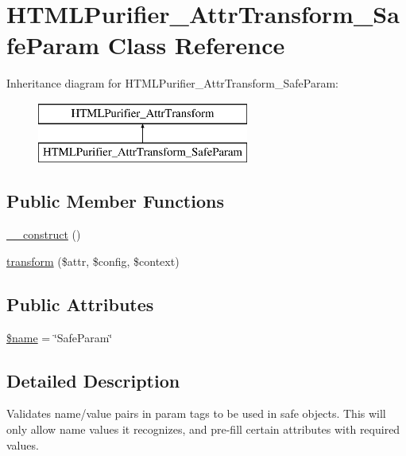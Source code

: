 \hypertarget{classHTMLPurifier__AttrTransform__SafeParam}{\section{H\+T\+M\+L\+Purifier\+\_\+\+Attr\+Transform\+\_\+\+Safe\+Param Class Reference}
\label{classHTMLPurifier__AttrTransform__SafeParam}
}
Inheritance diagram for H\+T\+M\+L\+Purifier\+\_\+\+Attr\+Transform\+\_\+\+Safe\+Param\+:\begin{figure}[H]
\begin{center}
\leavevmode
\includegraphics[height=2.000000cm]{classHTMLPurifier__AttrTransform__SafeParam}
\end{center}
\end{figure}
\subsection*{Public Member Functions}
\begin{DoxyCompactItemize}
\item 
\hyperlink{classHTMLPurifier__AttrTransform__SafeParam_adf81c967d3cee3fdafbcda841b3c742b}{\+\_\+\+\_\+construct} ()
\item 
\hyperlink{classHTMLPurifier__AttrTransform__SafeParam_a052a20ffffaf8c66d5de4c26278c5729}{transform} (\$attr, \$config, \$context)
\end{DoxyCompactItemize}
\subsection*{Public Attributes}
\begin{DoxyCompactItemize}
\item 
\hyperlink{classHTMLPurifier__AttrTransform__SafeParam_af4fd8183836a1d11286a76a0851f6b14}{\$name} = \char`\"{}Safe\+Param\char`\"{}
\end{DoxyCompactItemize}


\subsection{Detailed Description}
Validates name/value pairs in param tags to be used in safe objects. This will only allow name values it recognizes, and pre-\/fill certain attributes with required values.

